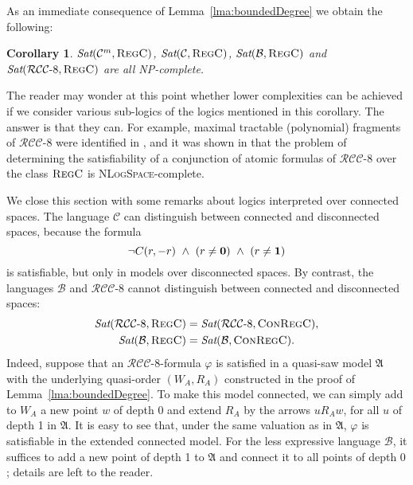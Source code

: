 \documentclass{LMCS}
\theoremstyle{plain}
\newtheorem{corollary}[thm]{Corollary}
\newcommand{\cB}{\ensuremath{\mathcal{B}}}\newcommand{\cBc}{\ensuremath{\mathcal{B}c}}\newcommand{\cBcc}{\ensuremath{\mathcal{B}cc}}
\newcommand{\cBC}{\ensuremath{\mathcal{C}}}
\newcommand{\cBCm}{\ensuremath{\mathcal{C}^m}}
\newcommand{\RCCE}{\ensuremath{\mathcal{RCC}\text{-}8}}\newcommand{\RCCEcc}{\ensuremath{\RCCE{}cc}}\newcommand{\RCCEc}{\ensuremath{\RCCE{}c}}
\newcommand{\fA}{\mathfrak{A}}\newcommand{\fB}{\mathfrak{B}}\newcommand{\fM}{\mathfrak{M}}\newcommand{\cK}{\mathcal{K}}\newcommand{\R}{\mathbb{R}}\newcommand{\cR}{\mathcal{R}}\newcommand{\cL}{\mathcal{L}}\newcommand{\cLc}{\mathcal{L}c}\newcommand{\cLcc}{\mathcal{L}cc}
\newcommand{\Sat}{\textit{Sat}}
\newcommand{\Regc}{\textsc{RegC}}
\newcommand{\ConR}{\textsc{ConRegC}}
\newcommand{\NLogSpace}{\textsc{NLogSpace}}
\newcommand{\NP}{\textsc{NP}}
\begin{document}
As an immediate consequence of Lemma~\ref{lma:boundedDegree} we obtain the following:
\begin{corollary}\label{NB-complexity}
$\Sat(\cBCm{},\Regc)$, $\Sat(\cBC{},\Regc)$, $\Sat(\cB{},\Regc)$ and
$\Sat(\RCCE{},\Regc)$ are all \NP-complete.
\end{corollary}

The reader may wonder at this point whether lower complexities can be
achieved if we consider various sub-logics of the logics mentioned in this corollary. The answer is that they can. For example, maximal tractable (polynomial) fragments of $\RCCE$ were identified in \cite{Renz99,Renz&Nebel99}, and it was shown in \cite{aledThesis} that
the problem of determining the satisfiability of a conjunction of atomic
formulas of $\RCCE{}$ over the class $\Regc$ is \NLogSpace-complete.

We close this section with some remarks about logics interpreted over
connected spaces. The language $\cBC$
can distinguish between connected and disconnected spaces, because the
formula
\begin{equation}\label{eq:connectedSpaces}
\neg C(r, -r) \ \wedge \ (r \neq \mathbf{0}) \  \wedge \ (r \neq \mathbf{1})
\end{equation}
is satisfiable, but only in models over disconnected spaces.  By
contrast, the languages $\cB$ and $\RCCE$ cannot distinguish between
connected and disconnected spaces:
\begin{align*}\Sat ( \RCCE, \Regc ) &= \Sat ( \RCCE, \ConR),\\
\Sat ( \cB, \Regc ) &= \Sat ( \cB, \ConR).
\end{align*}
Indeed, suppose that an $\RCCE$-formula $\varphi$ is satisfied in a
quasi-saw model $\fA$ with the underlying quasi-order $(W_A,R_A)$
constructed in the proof of Lemma~\ref{lma:boundedDegree}.  To make
this model connected, we can simply add to $W_A$ a new point $w$ of
depth 0 and extend $R_A$ by the arrows $uR_Aw$, for all $u$ of depth 1
in $\fA$. It is easy to see that, under the same valuation as in
$\fA$, $\varphi$ is satisfiable in the extended connected model. For
the less expressive language $\cB$, it suffices to add a new point of
depth 1 to $\fA$ and connect it to all points of depth $0$; details
are left to the reader.
\end{document}
